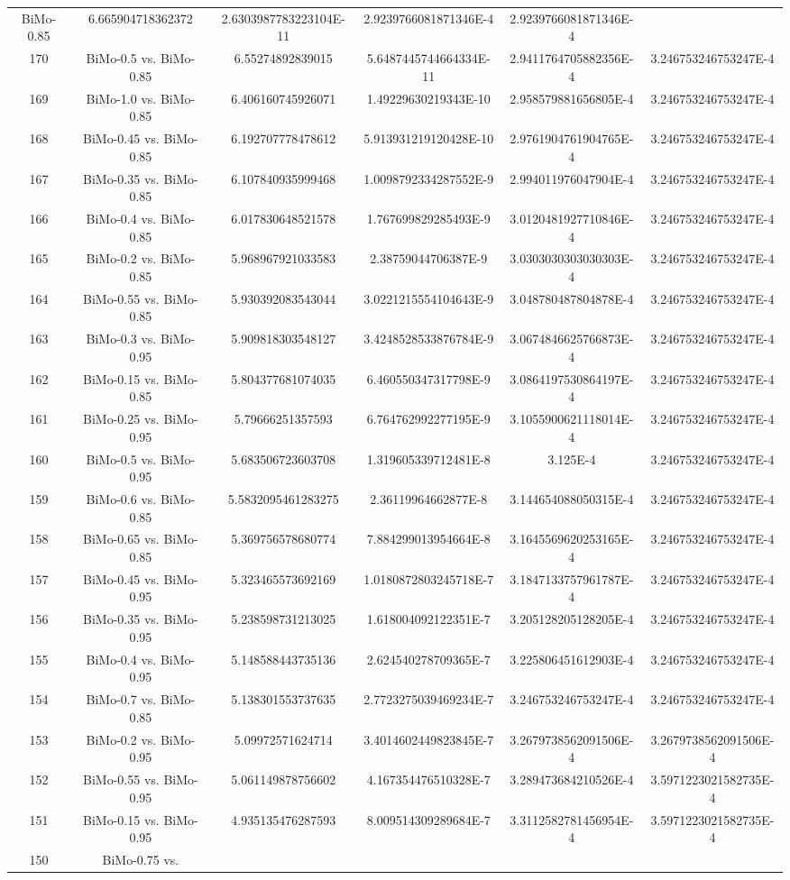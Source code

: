 \documentclass[a4paper,10pt]{article}
\begin{document}
\begin{landscape}
\begin{table}[!htp]
\begin{tabular}{cccccc}
BiMo-0.85&6.665904718362372&2.6303987783223104E-11&2.9239766081871346E-4&2.9239766081871346E-4\\170&BiMo-0.5 vs. BiMo-0.85&6.55274892839015&5.6487445744664334E-11&2.9411764705882356E-4&3.246753246753247E-4\\169&BiMo-1.0 vs. BiMo-0.85&6.406160745926071&1.49229630219343E-10&2.958579881656805E-4&3.246753246753247E-4\\168&BiMo-0.45 vs. BiMo-0.85&6.192707778478612&5.913931219120428E-10&2.9761904761904765E-4&3.246753246753247E-4\\167&BiMo-0.35 vs. BiMo-0.85&6.107840935999468&1.0098792334287552E-9&2.994011976047904E-4&3.246753246753247E-4\\166&BiMo-0.4 vs. BiMo-0.85&6.017830648521578&1.767699829285493E-9&3.0120481927710846E-4&3.246753246753247E-4\\165&BiMo-0.2 vs. BiMo-0.85&5.968967921033583&2.38759044706387E-9&3.0303030303030303E-4&3.246753246753247E-4\\164&BiMo-0.55 vs. BiMo-0.85&5.930392083543044&3.0221215554104643E-9&3.048780487804878E-4&3.246753246753247E-4\\163&BiMo-0.3 vs. BiMo-0.95&5.909818303548127&3.4248528533876784E-9&3.0674846625766873E-4&3.246753246753247E-4\\162&BiMo-0.15 vs. BiMo-0.85&5.804377681074035&6.460550347317798E-9&3.0864197530864197E-4&3.246753246753247E-4\\161&BiMo-0.25 vs. BiMo-0.95&5.79666251357593&6.764762992277195E-9&3.1055900621118014E-4&3.246753246753247E-4\\160&BiMo-0.5 vs. BiMo-0.95&5.683506723603708&1.319605339712481E-8&3.125E-4&3.246753246753247E-4\\159&BiMo-0.6 vs. BiMo-0.85&5.5832095461283275&2.36119964662877E-8&3.144654088050315E-4&3.246753246753247E-4\\158&BiMo-0.65 vs. BiMo-0.85&5.369756578680774&7.884299013954664E-8&3.1645569620253165E-4&3.246753246753247E-4\\157&BiMo-0.45 vs. BiMo-0.95&5.323465573692169&1.0180872803245718E-7&3.1847133757961787E-4&3.246753246753247E-4\\156&BiMo-0.35 vs. BiMo-0.95&5.238598731213025&1.618004092122351E-7&3.205128205128205E-4&3.246753246753247E-4\\155&BiMo-0.4 vs. BiMo-0.95&5.148588443735136&2.624540278709365E-7&3.225806451612903E-4&3.246753246753247E-4\\154&BiMo-0.7 vs. BiMo-0.85&5.138301553737635&2.7723275039469234E-7&3.246753246753247E-4&3.246753246753247E-4\\153&BiMo-0.2 vs. BiMo-0.95&5.09972571624714&3.4014602449823845E-7&3.2679738562091506E-4&3.2679738562091506E-4\\152&BiMo-0.55 vs. BiMo-0.95&5.061149878756602&4.167354476510328E-7&3.289473684210526E-4&3.5971223021582735E-4\\151&BiMo-0.15 vs. BiMo-0.95&4.935135476287593&8.009514309289684E-7&3.3112582781456954E-4&3.5971223021582735E-4\\150&BiMo-0.75 vs. 
\end{tabular}
\end{table}
\end{landscape}
\end{document}
